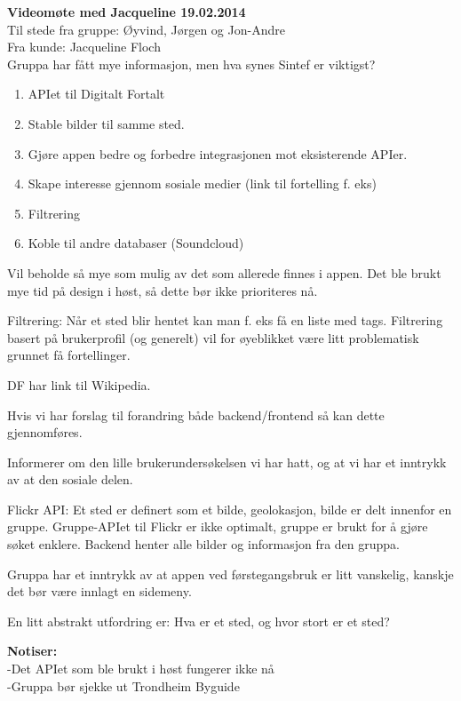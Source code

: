 \textbf{Videomøte med Jacqueline 19.02.2014}\\

	Til stede fra gruppe: Øyvind, Jørgen og Jon-Andre \\
	Fra kunde: Jacqueline Floch\\

Gruppa har fått mye informasjon, men hva synes Sintef er viktigst? \\
\begin{enumerate}
\item APIet til Digitalt Fortalt
\item Stable bilder til samme sted.
\item Gjøre appen bedre og forbedre integrasjonen mot eksisterende APIer.
\item Skape interesse gjennom sosiale medier (link til fortelling f. eks)
\item Filtrering
\item Koble til andre databaser (Soundcloud)
\end{enumerate}

Vil beholde så mye som mulig av det som allerede finnes i appen. Det ble brukt mye tid på design i høst, så dette bør ikke prioriteres nå.

Filtrering: Når et sted blir hentet kan man f. eks få en liste med tags. Filtrering basert på brukerprofil (og generelt) vil for øyeblikket være litt problematisk grunnet få fortellinger.  

DF har link til Wikipedia.

Hvis vi har forslag til forandring både backend/frontend så kan dette gjennomføres.

Informerer om den lille brukerundersøkelsen vi har hatt, og at vi har et inntrykk av at den sosiale delen. 

Flickr API: Et sted er definert som et bilde, geolokasjon, bilde er delt innenfor en gruppe. Gruppe-APIet til Flickr er ikke optimalt, gruppe er brukt for å gjøre søket enklere. Backend henter alle bilder og informasjon fra den gruppa.

Gruppa har et inntrykk av at appen ved førstegangsbruk er litt vanskelig, kanskje det bør være innlagt en sidemeny.

En litt abstrakt utfordring er: Hva er et sted, og hvor stort er et sted?

\textbf{Notiser:}\\
 	-Det APIet som ble brukt i høst fungerer ikke nå\\
	-Gruppa bør sjekke ut Trondheim Byguide\\

